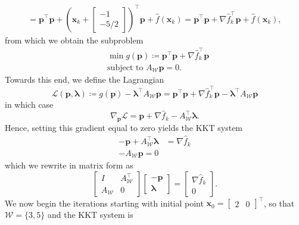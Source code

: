 \documentclass{../kin_math}
\begin{document}
\begin{questions}
\begin{enumerate}
\begin{solution}
\begin{multline*}
        = \textbf{p}^\top \textbf{p} + \left(\textbf{x}_k + \begin{bmatrix} -1 \\ -5 / 2 \end{bmatrix}\right)^\top \textbf{p} + \hat{f}(\textbf{x}_k) = \textbf{p}^\top \textbf{p} + \nabla \hat{f}_k^\top \textbf{p} + \hat{f}(\textbf{x}_k),
      \end{multline*}
      from which we obtain the subproblem
      \begin{align*}
        &\min g(\textbf{p}) \coloneqq \textbf{p}^\top \textbf{p} + \nabla \hat{f}_k^\top \textbf{p} \\
        &\text{subject to } A_{\mathcal{W}} \textbf{p} = 0.
      \end{align*}
      Towards this end, we define the Lagrangian
      \begin{equation*}
        \mathcal{L}(\textbf{p}, \boldsymbol{\lambda}) \coloneqq g(\textbf{p}) - \boldsymbol{\lambda}^\top A_{\mathcal{W}} \textbf{p} = \textbf{p}^\top \textbf{p} + \nabla \hat{f}_k^\top \textbf{p} - \boldsymbol{\lambda}^\top A_{\mathcal{W}} \textbf{p}
      \end{equation*}
      in which case
      \begin{equation*}
        \nabla_{\textbf{p}} \mathcal{L} = \textbf{p} + \nabla \hat{f}_k - A_{\mathcal{W}}^\top \boldsymbol{\lambda}.
      \end{equation*}
      Hence, setting this gradient equal to zero yields the KKT system
      \begin{align*}
        -\textbf{p} + A_{\mathcal{W}}^\top \boldsymbol{\lambda} &= \nabla \hat{f}_k \\
        -A_{\mathcal{W}} \textbf{p} = 0
      \end{align*}
      which we rewrite in matrix form as
      \begin{equation*}
        \begin{bmatrix} I & A_{\mathcal{W}}^\top \\ A_{\mathcal{W}} & 0 \end{bmatrix} \begin{bmatrix} -\textbf{p} \\ \boldsymbol{\lambda} \end{bmatrix} = \begin{bmatrix} \nabla \hat{f}_k \\ 0 \end{bmatrix}.
      \end{equation*}
      We now begin the iterations starting with initial point $\textbf{x}_0 = \begin{bmatrix} 2 & 0 \end{bmatrix}^\top$, so that $\mathcal{W} = \{3, 5\}$ and the KKT system is

\end{solution}
\end{enumerate}
\end{questions}
\end{document}
